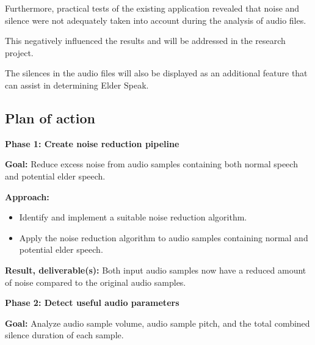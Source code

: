 \documentclass[english]{hogent-article}
\begin{document}
Furthermore, practical tests of the existing application revealed that noise and silence were not adequately taken into account during the analysis of audio files.

This negatively influenced the results and will be addressed in the research project.

The silences in the audio files will also be displayed as an additional feature that can assist in determining Elder Speak.

\subsection*{Plan of action}
\label{subsec:plan-of-action}

\textbf{Phase 1: Create noise reduction pipeline}

\textbf{Goal:} Reduce excess noise from audio samples containing both normal speech and potential elder speech.

\textbf{Approach:}
\begin{itemize}
    \item Identify and implement a suitable noise reduction algorithm.
    \item Apply the noise reduction algorithm to audio samples containing normal and potential elder speech.
\end{itemize}

\textbf{Result, deliverable(s):} Both input audio samples now have a reduced amount of noise compared to the original audio samples.

\textbf{Phase 2: Detect useful audio parameters}

\textbf{Goal:} Analyze audio sample volume, audio sample pitch, and the total combined silence duration of each sample.
\end{document}
